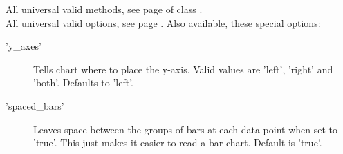 \Methods
All universal valid methods, see page \pageref{methods}
of class .\\[\parabstand]
%
\Attributes
All universal valid options, see page \pageref{options}. Also available, these special options:
\begin{description}
\item['y\_axes'] Tells chart where to place the y-axis. 
                 Valid values are 'left', 'right' and 'both'. Defaults to 'left'.
\item['spaced\_bars'] Leaves space between the groups of bars at each data point 
                      when set to 'true'.  
                      This just makes it easier to read a bar chart.  Default is 'true'.
\end{description}
